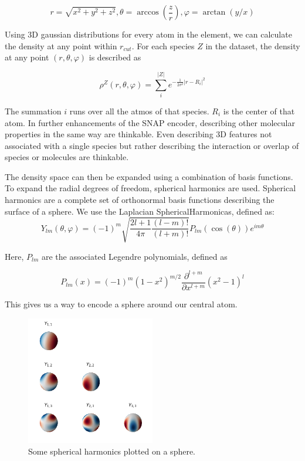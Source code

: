 $$
r = \sqrt{x^2 + y^2 + z^2}
,
\theta = \arccos(\frac{z}{r})
,
\varphi = \arctan(y / x)
$$

Using 3D gaussian distributions for every atom in the element, we can calculate the density at any point within $r_{cut}$.
For each species $Z$ in the dataset, the density at any point $(r, \theta, \varphi)$ is described as

$$\rho^Z(r, \theta, \varphi) = \sum_i^{|Z|} e^{- \frac{1}{2\sigma^2} \vert r - R_i \vert^2 }$$ %

The summation $i$ runs over all the atmos of that species. $R_i$ is the center of that atom. %
In further enhancements of the SNAP encoder, describing other molecular properties in the same way are thinkable.
Even describing 3D features not associated with a single species but rather describing the interaction or overlap of species 
or molecules are thinkable.

The density space can then be expanded using a combination of basis functions.
To expand the radial degrees of freedom, spherical harmonics are used.
Spherical harmonics are a complete set of orthonormal basis functions describing the surface of a sphere.
We use the Laplacian SphericalHarmonicas, defined as:
$$
Y_{lm}(\theta, \varphi) = (-1)^m \sqrt{\frac{2l + 1}{4 \pi} \frac{(l - m)!}{(l + m)!}} P_{lm}\left(\cos(\theta) \right) e^{im\theta}
$$



Here, $P_{lm}$ are the associated Legendre polynomials, defined as

$$
P_{lm}(x) = (-1)^m (1-x^2)^{m/2} \frac{\partial^{l+m}}{\partial x^{l+m}}(x^2 - 1)^l
$$ %


This gives us a way to encode a sphere around our central atom. 

\begin{figure} [h]
  \centering
  \includegraphics[width=0.5\textwidth]{figures/snap/sph-harm.png} %
  \caption{Some spherical harmonics plotted on a sphere.}
  \label{fig:sphharm}
\end{figure}

